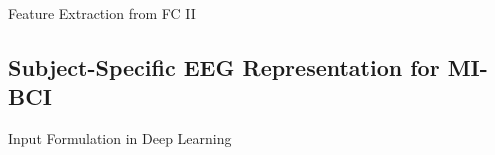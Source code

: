 \documentclass[aspectratio=169]{beamer}
\begin{document}
\begin{frame}{Feature Extraction from FC II}
    \centering
\end{frame}


\subsection{Subject-Specific EEG Representation for MI-BCI}


\begin{frame}{Input Formulation in Deep Learning}
    \begin{figure}[!ht]
        \centering
    \end{figure}
\end{frame}
\end{document}

